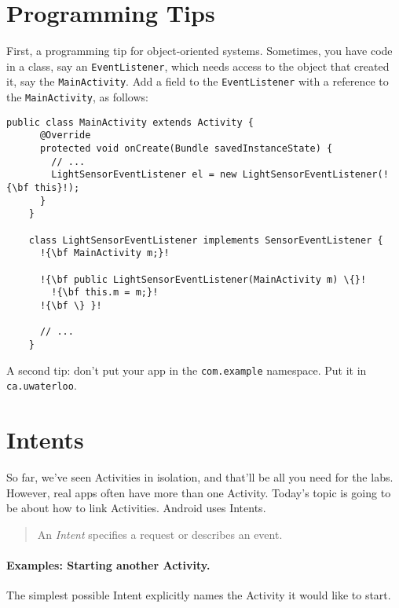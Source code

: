 




\section*{Programming Tips}

First, a programming tip for object-oriented systems. Sometimes, you have code
in a class, say an {\tt EventListener}, which needs access to the object
that created it, say the {\tt MainActivity}. Add a field to the {\tt EventListener}
with a reference to the {\tt MainActivity}, as follows:

{\scriptsize \begin{lstlisting}[escapechar=!]
    public class MainActivity extends Activity {
      @Override
      protected void onCreate(Bundle savedInstanceState) {
        // ...
        LightSensorEventListener el = new LightSensorEventListener(!{\bf this}!);
      }
    }

    class LightSensorEventListener implements SensorEventListener {
      !{\bf MainActivity m;}!

      !{\bf public LightSensorEventListener(MainActivity m) \{}!
        !{\bf this.m = m;}!
      !{\bf \} }!

      // ...
    }
\end{lstlisting}
}

A second tip: don't put your app in the {\tt com.example} namespace. Put it
in {\tt ca.uwaterloo}.

\section*{Intents}
So far, we've seen Activities in isolation, and that'll be all you need
for the labs. However, real apps often have more than one Activity. Today's topic
is going to be about how to link Activities. Android uses Intents.

\begin{quote}
An \emph{Intent} specifies a request or describes an event.
\end{quote}

\paragraph{Examples: Starting another Activity.} The simplest possible Intent
explicitly names the Activity it would like to start.

